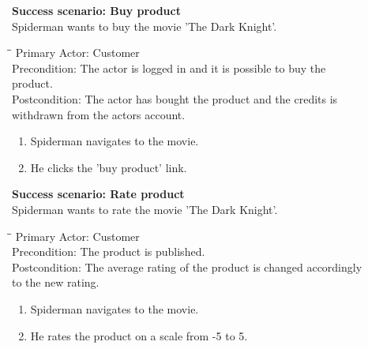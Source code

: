 \vspace{3mm}
\textbf{Success scenario: Buy product} \\
Spiderman wants to buy the movie 'The Dark Knight'. 
\begin{tabbing}
\hspace{5mm}\=\hspace{26mm}\=\kill
\>Primary Actor:\> Customer\\
\>Precondition:\> The actor is logged in and it is possible to buy the\\ \hspace{85px} product.\\
\>Postcondition:\> The actor has bought the product and the credits is\\ \hspace{85px} withdrawn from the actors account.
\end{tabbing}
\begin{enumerate} \setlength{\itemsep}{-1mm}
	\item Spiderman navigates to the movie.
	\item He clicks the 'buy product' link.
\end{enumerate}

\vspace{3mm}
\textbf{Success scenario: Rate product} \\
Spiderman wants to rate the movie 'The Dark Knight'. 
\begin{tabbing}
\hspace{5mm}\=\hspace{26mm}\=\kill
\>Primary Actor:\> Customer\\
\>Precondition:\> The product is published.\\
\>Postcondition:\> The average rating of the product is changed accordingly\\ \hspace{85px} to the new rating.
\end{tabbing}
\begin{enumerate} \setlength{\itemsep}{-1mm}
	\item Spiderman navigates to the movie.
	\item He rates the product on a scale from -5 to 5.
\end{enumerate}